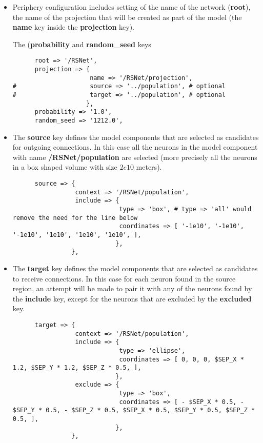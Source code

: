 \documentclass[12pt]{article}
\begin{document}
\begin{itemize}
\item Periphery configuration includes setting of the name of the
  network ({\bf root}), the name of the projection that will be
  created as part of the model (the {\bf name} key inside the {\bf
    projection} key).

  The ({\bf probability} and {\bf random\_seed} keys
\begin{verbatim}
      root => '/RSNet',
      projection => {
                     name => '/RSNet/projection',
#                    source => '../population', # optional
#                    target => '../population', # optional
                    },
      probability => '1.0',
      random_seed => '1212.0',
\end{verbatim}
\item The {\bf source} key defines the model components that are
  selected as candidates for outgoing connections.  In this case all
  the neurons in the model component with name {\bf /RSNet/population}
  are selected (more precisely all the neurons in a box shaped volume
  with size $2e10$ meters).
\begin{verbatim}
      source => {
                 context => '/RSNet/population',
                 include => {
                             type => 'box', # type => 'all' would remove the need for the line below
                             coordinates => [ '-1e10', '-1e10', '-1e10', '1e10', '1e10', '1e10', ],
                            },
                },
\end{verbatim}
\item The {\bf target} key defines the model components that are
  selected as candidates to receive connections.  In this case for
  each neuron found in the source region, an attempt will be made to
  pair it with any of the neurons found by the {\bf include} key,
  except for the neurons that are excluded by the {\bf excluded} key.
\begin{verbatim}
      target => {
                 context => '/RSNet/population',
                 include => {
                             type => 'ellipse',
                             coordinates => [ 0, 0, 0, $SEP_X * 1.2, $SEP_Y * 1.2, $SEP_Z * 0.5, ],
                            },
                 exclude => {
                             type => 'box',
                             coordinates => [ - $SEP_X * 0.5, - $SEP_Y * 0.5, - $SEP_Z * 0.5, $SEP_X * 0.5, $SEP_Y * 0.5, $SEP_Z * 0.5, ],
                            },
                },
\end{verbatim}

\end{itemize}
\end{document}
